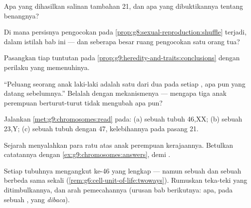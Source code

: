 \begin{exercise}[$\star$]\label{exo:g9:chromosomes:6}
Apa yang dihasilkan salinan tambahan  21, dan apa
yang dibuktikannya tentang benangnya?
\end{exercise}

\begin{exercise}[$\star\star$]\label{exo:g9:chromosomes:7}
Di mana persisnya pengocokan pada
\cref{prop:g8:sexual-reproduction:shuffle} terjadi, dalam
istilah bab ini --- dan seberapa besar ruang pengocokan satu
orang tua?
\end{exercise}

\begin{exercise}[$\star\star$]\label{exo:g9:chromosomes:8}
Pasangkan tiap tuntutan pada
\cref{prop:g9:heredity-and-traits:conclusions} dengan
perilaku  yang memenuhinya.
\end{exercise}

\begin{exercise}[$\star\star$]\label{exo:g9:chromosomes:9}
``Peluang seorang anak laki-laki adalah satu dari dua pada
setiap , apa pun yang datang sebelumnya.'' Belalah
dengan mekanismenya --- mengapa tiga anak perempuan
berturut-turut tidak mengubah apa pun?
\end{exercise}

\begin{exercise}[$\star\star$]\label{exo:g9:chromosomes:10}
Jalankan \cref{met:g9:chromosomes:read} pada: (a) sebuah 
tubuh 46,XX; (b) sebuah  23,Y; (c) sebuah  tubuh
dengan 47, kelebihannya pada pasang 21.
\end{exercise}

\begin{exercise}[$\star\star$]\label{exo:g9:chromosomes:11}
Sejarah menyalahkan para ratu atas anak perempuan
kerajaannya. Betulkan catatannya dengan
\cref{ex:g9:chromosomes:answers},  demi .
\end{exercise}

\begin{exercise}[$\star\star\star$]\label{exo:g9:chromosomes:12}
Setiap  tubuhnya mengangkut ke-46 yang lengkap --- namun
sebuah  dan sebuah   berbeda sama sekali
(\cref{rem:g6:cell-unit-of-life:twoways}). Rumuskan
teka-teki yang ditimbulkannya, dan arah pemecahannya (urusan
bab berikutnya: apa, pada sebuah , yang
\emph{dibaca}).
\end{exercise}

